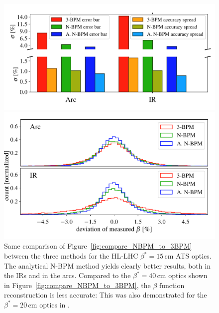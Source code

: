 \begin{figure}
	\centering
  \includegraphics[width=\linewidth]{comparison_statistics_HL007_bars}
	
    \includegraphics[width=\linewidth]{comparison_statistics_HL006}
	
	\caption{Same comparison of Figure~\ref{fig:compare_NBPM_to_3BPM} between the three methods for the HL-LHC $ \beta^*= 15\,\text{cm} $ ATS optics. The analytical N-BPM method yields clearly better results, both in the IRs and in the arcs. Compared to the $ \beta^*=40\,\text{cm} $ optics shown in Figure~\ref{fig:compare_NBPM_to_3BPM}, the $ \beta $ function reconstruction is less accurate: This was also demonstrated for the $ \beta^*=20\,\text{cm} $ optics in \cite{nbpm}. }
	\label{fig:compare_ATS}
\end{figure}



